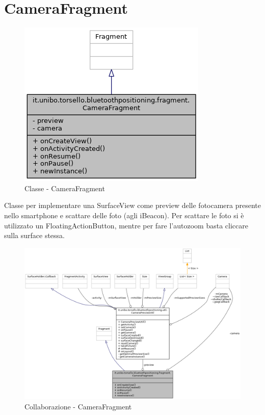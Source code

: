 \section{CameraFragment}
\begin{figure}[ph]
	\centering
	\includegraphics[width=0.5\linewidth]{img/uml/class/classit_1_1unibo_1_1torsello_1_1bluetoothpositioning_1_1fragment_1_1CameraFragment__inherit__graph.png}
	\caption{Classe - CameraFragment}
\end{figure}

Classe per implementare una SurfaceView come preview delle fotocamera presente nello smartphone e scattare delle foto (agli iBeacon). Per scattare le foto si è utilizzato un FloatingActionButton, mentre per fare l'autozoom basta cliccare sulla surface stessa.

\begin{figure}[ph]
	\centering
	\includegraphics[width=1.5\linewidth, angle=90]{img/uml/class/classit_1_1unibo_1_1torsello_1_1bluetoothpositioning_1_1fragment_1_1CameraFragment__coll__graph.png}
	\caption{Collaborazione - CameraFragment}
\end{figure}


